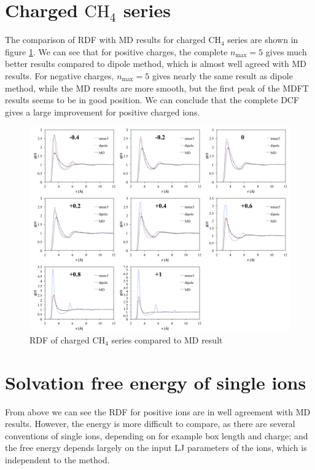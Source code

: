 \section{Charged $\mathrm{CH_{4}}$ series}

The comparison of \acs{RDF} with \acs{MD} results for charged $\mathrm{CH_{4}}$
series are shown in figure \ref{fig:Comparison-to-MD}. We can see
that for positive charges, the complete $n_{\max}=5$ gives much better
results compared to dipole method, which is almost well agreed with
\acs{MD} results. For negative charges, $n_{\max}=5$ gives nearly
the same result as dipole method, while the \acs{MD} results are
more smooth, but the first peak of the \acs{MDFT} results seems to
be in good position. We can conclude that the complete \acs{DCF}
gives a large improvement for positive charged ions.

\begin{figure}[h]
\begin{centering}
\includegraphics[width=1\columnwidth]{_figure/results/ch4_md}
\par\end{centering}
\caption{\acs{RDF} of charged $\mathrm{CH_{4}}$ series compared to \acs{MD}
result\label{fig:Comparison-to-MD}}
\end{figure}


\section{Solvation free energy of single ions}

From above we can see the \acs{RDF} for positive ions are in well
agreement with \acs{MD} results. However, the energy is more difficult
to compare, as there are several conventions of single ions, depending
on for example box length and charge; and the free energy depends
largely on the input LJ parameters of the ions, which is independent
to the method.

